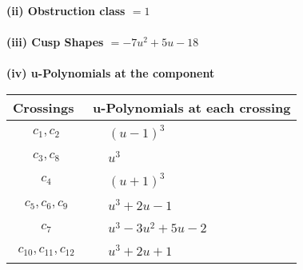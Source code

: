 \documentclass[1p]{elsarticle_modified}
\theoremstyle{definition}
\begin{document}
\flushleft \textbf{(ii) Obstruction class $= 1$}\\~\\
\flushleft \textbf{(iii) Cusp Shapes $= -7 u^2+5 u-18$}\\~\\
\newpage\renewcommand{\arraystretch}{1}
\flushleft \textbf{(iv) u-Polynomials at the component}\newline \\
\begin{tabular}{m{50pt}|m{274pt}}
Crossings & \hspace{64pt}u-Polynomials at each crossing \\
\hline $$\begin{aligned}c_{1},c_{2}\end{aligned}$$&$\begin{aligned}
&(u-1)^3
\end{aligned}$\\
\hline $$\begin{aligned}c_{3},c_{8}\end{aligned}$$&$\begin{aligned}
&u^3
\end{aligned}$\\
\hline $$\begin{aligned}c_{4}\end{aligned}$$&$\begin{aligned}
&(u+1)^3
\end{aligned}$\\
\hline $$\begin{aligned}c_{5},c_{6},c_{9}\end{aligned}$$&$\begin{aligned}
&u^3+2 u-1
\end{aligned}$\\
\hline $$\begin{aligned}c_{7}\end{aligned}$$&$\begin{aligned}
&u^3-3 u^2+5 u-2
\end{aligned}$\\
\hline $$\begin{aligned}c_{10},c_{11},c_{12}\end{aligned}$$&$\begin{aligned}
&u^3+2 u+1
\end{aligned}$\\
\hline
\end{tabular}\\~\\
\newpage\renewcommand{\arraystretch}{1}
\end{document}
